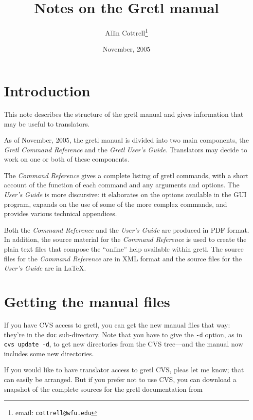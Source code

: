 \documentclass{article}
\begin{document}
\title{Notes on the Gretl manual}
\author{Allin Cottrell\thanks{email: \texttt{cottrell@wfu.edu}}}
\date{November, 2005}

\maketitle

\setcounter{tocdepth}{1}
\tableofcontents

\section{Introduction}

This note describes the structure of the \textsf{gretl} manual and
gives information that may be useful to translators.

As of November, 2005, the gretl manual is divided into two main
components, the \textit{Gretl Command Reference} and the \textit{Gretl
  User's Guide}.  Translators may decide to work on one or both of
these components.

The \textit{Command Reference} gives a complete listing of
\textsf{gretl} commands, with a short account of the function of each
command and any arguments and options.  The \textit{User's Guide} is
more discursive: it elaborates on the options available in the GUI
program, expands on the use of some of the more complex commands, and
provides various technical appendices.

Both the \textit{Command Reference} and the \textit{User's Guide} are
produced in PDF format.  In addition, the source material for the
\textit{Command Reference} is used to create the plain text files that
compose the ``online'' help available within \textsf{gretl}.  The
source files for the \textit{Command Reference} are in XML format and
the source files for the \textit{User's Guide} are in \LaTeX.

\section{Getting the manual files}
\label{getit}

If you have CVS access to gretl, you can get the new manual files that
way: they're in the \texttt{doc} sub-directory.  Note that you have to
give the \texttt{-d} option, as in \texttt{cvs update -d}, to get new
directories from the CVS tree---and the manual now includes some new
directories.

If you would like to have translator access to \textsf{gretl} CVS,
pleas let me know; that can easily be arranged.  But if you prefer not
to use CVS, you can download a snapshot of the complete sources for
the \textsf{gretl} documentation from
\end{document}

